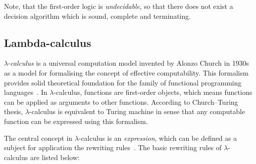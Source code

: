 \documentclass[article]{aaltoseries}
\begin{document}
Note, that the first-order logic is \textit{undecidable}, so that there does not exist a decision algorithm which is sound, complete and terminating.





\subsection{Lambda-calculus}

$\lambda$-\textit{calculus} is a universal computation model invented by Alonzo Church in 1930s as a model for formalising the concept of effective computability. This formalism provides solid theoretical foundation for the family of functional programming languages~\cite{Roj15}. In $\lambda$-calculus, functions are first-order objects, which means functions can be applied as arguments to other functions. According to Church–Turing thesis, $\lambda$-calculus is equivalent to Turing machine in sense that any computable function can be expressed using this formalism.

The central concept in $\lambda$-calculus is an \textit{expression}, which can be defined as a subject for application the rewriting rules~\cite{Bar88}. The basic rewriting rules of $\lambda$-calculus are listed below:
\end{document}
